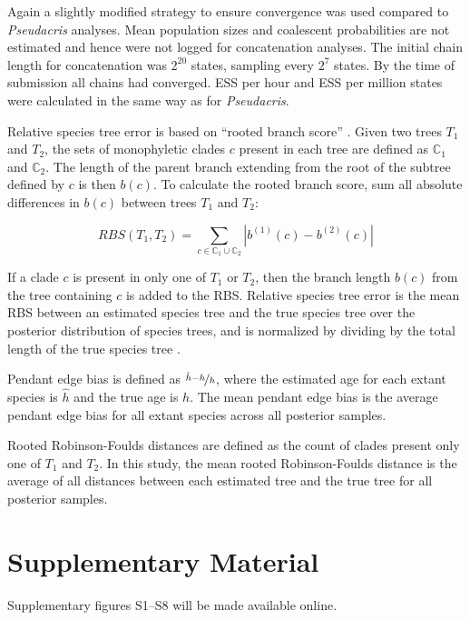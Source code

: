 \documentclass[nogrid]{MBE}%
\begin{document}
Again a slightly modified strategy to ensure convergence was used compared to
\textit{Pseudacris} analyses. Mean population sizes and coalescent probabilities
are not estimated and hence were not logged for concatenation analyses. The
initial chain length for concatenation was $2^{20}$ states, sampling every
$2^{7}$ states. By the time of submission all chains had converged. ESS per hour
and ESS per million states were calculated in the same way as for
\textit{Pseudacris}.

Relative species tree error is based on ``rooted branch score''
\citep[RBS;][]{Heled2013}. Given two trees $T_1$ and $T_2$, the sets of
monophyletic clades $c$ present in each tree are defined as $\mathbb{C}_1$ and
$\mathbb{C}_2$. The length of the parent branch extending from the root of the
subtree defined by $c$ is then $b(c)$. To calculate the rooted branch score, sum
all absolute differences in $b(c)$ between trees $T_1$ and $T_2$:

\begin{equation}
RBS(T_1, T_2) = \sum_{c \in {\mathbb{C}_1} \cup {\mathbb{C}_2}} |b^{(1)}(c) - b^{(2)}(c)|
\end{equation}

If a clade $c$ is present in only one of $T_1$ or $T_2$, then the branch length
$b(c)$ from the tree containing $c$ is added to the RBS. Relative species tree
error is the mean RBS between an estimated species tree and the true
species tree over the posterior distribution of species trees, and is normalized
by dividing by the total length of the true species tree
\citep{Ogilvie01052016}.

Pendant edge bias is defined as $\nicefrac{\hat{h} - h}{h}$, where the estimated
age for each extant species is $\hat{h}$ and the true age is $h$. The mean
pendant edge bias is the average pendant edge bias for all extant species across
all posterior samples.

Rooted Robinson-Foulds distances \citep{ROBINSON1981131} are defined as the
count of clades present only one of $T_1$ and $T_2$. In this study, the mean
rooted Robinson-Foulds distance is the average of all distances between each
estimated tree and the true tree for all posterior samples.

\section{Supplementary Material}
Supplementary figures S1--S8 will be made available online.
\end{document}
